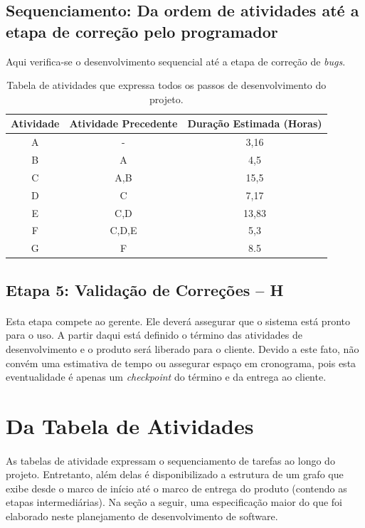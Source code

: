 \documentclass[12pt,a4paper]{article}
\begin{document}
		\subsection{Sequenciamento: Da ordem de atividades até a etapa de correção pelo programador}
		Aqui verifica-se o desenvolvimento sequencial até a etapa de correção de \textit{bugs}.
		\begin{table}[!ht]
		\centering
        \begin{tabular}{|c|c|c|}
        \hline 
        Atividade & Atividade Precedente & Duração Estimada (Horas) \\ 
		 \hline 
		A & - & 3,16 \\ 
		\hline 
		B & A & 4,5 \\         
        \hline 
        C & A,B & 15,5 \\ 
        \hline 
        D & C & 7,17 \\ 
        \hline 
        E & C,D & 13,83 \\ 
        \hline 	
        F & C,D,E &  5,3 \\
        \hline
        G & F & 8.5 \\
        \hline
        
        \end{tabular}	
        \caption{Tabela de atividades que expressa todos os passos de desenvolvimento do projeto.}
		\end{table}
		\subsection{Etapa 5: Validação de Correções -- H}
		\paragraph{} Esta etapa compete ao gerente. Ele deverá assegurar que o sistema está pronto para o uso. A partir daqui está definido o término das atividades de desenvolvimento e o produto será liberado para o cliente. Devido a este fato, não convém uma estimativa de tempo ou assegurar espaço em cronograma, pois esta eventualidade é apenas um \textit{checkpoint} do término e da entrega ao cliente.
 		\section{Da Tabela de Atividades}
		\paragraph{} As tabelas de atividade expressam o sequenciamento de tarefas ao longo do projeto. Entretanto, além delas é disponibilizado a estrutura de um grafo que exibe desde o marco de início até o marco de entrega do produto (contendo as etapas intermediárias). Na seção a seguir, uma especificação maior do que foi elaborado neste planejamento de desenvolvimento de software.
		
\end{document}
